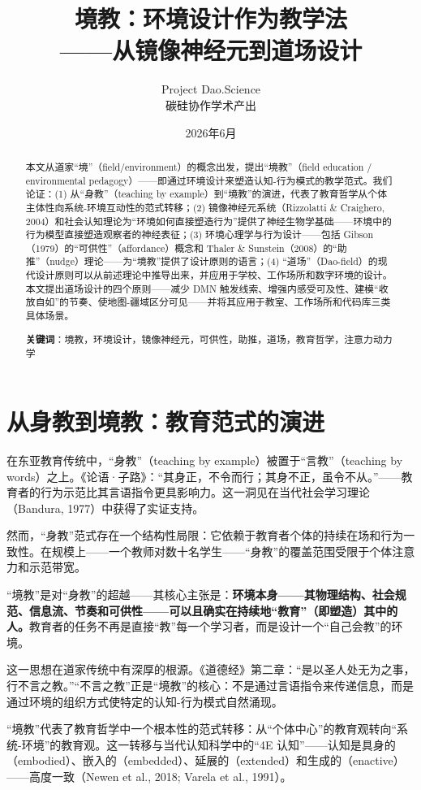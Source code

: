 \documentclass[UTF8,12pt,a4paper]{ctexart}
\title{\textbf{境教：环境设计作为教学法\\——从镜像神经元到道场设计}}
\author{Project Dao.Science\\碳硅协作学术产出}
\date{2026年6月}
\begin{document}
\maketitle

\begin{abstract}
本文从道家``境''（field/environment）的概念出发，提出``境教''（field education / environmental pedagogy）——即通过环境设计来塑造认知-行为模式的教学范式。我们论证：(1) 从``身教''（teaching by example）到``境教''的演进，代表了教育哲学从个体主体性向系统-环境互动性的范式转移；(2) 镜像神经元系统（Rizzolatti \& Craighero, 2004）和社会认知理论为``环境如何直接塑造行为''提供了神经生物学基础——环境中的行为模型直接塑造观察者的神经表征；(3) 环境心理学与行为设计——包括 Gibson（1979）的``可供性''（affordance）概念和 Thaler \& Sunstein（2008）的``助推''（nudge）理论——为``境教''提供了设计原则的语言；(4) ``道场''（Dao-field）的现代设计原则可以从前述理论中推导出来，并应用于学校、工作场所和数字环境的设计。本文提出道场设计的四个原则——减少 DMN 触发线索、增强内感受可及性、建模``收放自如''的节奏、使地图-疆域区分可见——并将其应用于教室、工作场所和代码库三类具体场景。

\textbf{关键词}：境教，环境设计，镜像神经元，可供性，助推，道场，教育哲学，注意力动力学
\end{abstract}

\section{从身教到境教：教育范式的演进}

在东亚教育传统中，``身教''（teaching by example）被置于``言教''（teaching by words）之上。《论语·子路》：``其身正，不令而行；其身不正，虽令不从。''——教育者的行为示范比其言语指令更具影响力。这一洞见在当代社会学习理论（Bandura, 1977）中获得了实证支持。

然而，``身教''范式存在一个结构性局限：它依赖于教育者个体的持续在场和行为一致性。在规模上——一个教师对数十名学生——``身教''的覆盖范围受限于个体注意力和示范带宽。

``境教''是对``身教''的超越——其核心主张是：\textbf{环境本身——其物理结构、社会规范、信息流、节奏和可供性——可以且确实在持续地``教育''（即塑造）其中的人。}教育者的任务不再是直接``教''每一个学习者，而是设计一个``自己会教''的环境。

这一思想在道家传统中有深厚的根源。《道德经》第二章：``是以圣人处无为之事，行不言之教。''``不言之教''正是``境教''的核心：不是通过言语指令来传递信息，而是通过环境的组织方式使特定的认知-行为模式自然涌现。

``境教''代表了教育哲学中一个根本性的范式转移：从``个体中心''的教育观转向``系统-环境''的教育观。这一转移与当代认知科学中的``4E 认知''——认知是具身的（embodied）、嵌入的（embedded）、延展的（extended）和生成的（enactive）——高度一致（Newen et al., 2018; Varela et al., 1991）。
\end{document}
